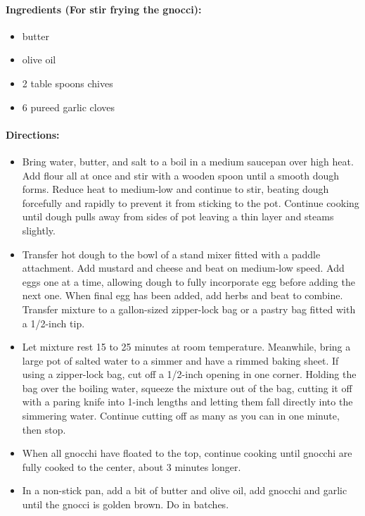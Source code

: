 \documentclass{article}
\begin{document}
\paragraph{Ingredients (For stir frying the gnocci):}

\begin{itemize}
	\item butter
	\item olive oil
	\item 2 table spoons chives
	\item 6 pureed garlic cloves
\end{itemize}


\paragraph{Directions:}
\begin{itemize}
	\item Bring water, butter, and salt to a boil in a medium saucepan over high heat. Add flour all at once and stir with a wooden spoon until a smooth dough forms. Reduce heat to medium-low and continue to stir, beating dough forcefully and rapidly to prevent it from sticking to the pot. Continue cooking until dough pulls away from sides of pot leaving a thin layer and steams slightly.
	\item Transfer hot dough to the bowl of a stand mixer fitted with a paddle attachment. Add mustard and cheese and beat on medium-low speed. Add eggs one at a time, allowing dough to fully incorporate egg before adding the next one. When final egg has been added, add herbs and beat to combine. Transfer mixture to a gallon-sized zipper-lock bag or a pastry bag fitted with a 1/2-inch tip.
	\item Let mixture rest 15 to 25 minutes at room temperature. Meanwhile, bring a large pot of salted water to a simmer and have a rimmed baking sheet. If using a zipper-lock bag, cut off a 1/2-inch opening in one corner. Holding the bag over the boiling water, squeeze the mixture out of the bag, cutting it off with a paring knife into 1-inch lengths and letting them fall directly into the simmering water. Continue cutting off as many as you can in one minute, then stop.
	\item When all gnocchi have floated to the top, continue cooking until gnocchi are fully cooked to the center, about 3 minutes longer. 
	\item In a non-stick pan, add a bit of butter and olive oil, add gnocchi and garlic until the gnocci is golden brown. Do in batches.
\end{itemize}
\end{document}
